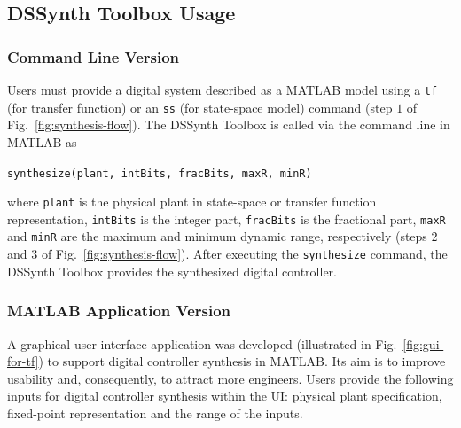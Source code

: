 \documentclass[10pt,conference]{IEEEtran}
\newcommand\tool{{DSSynth Toolbox}\xspace}
\begin{document}
\subsection{\tool Usage}

\subsubsection{Command Line Version}

Users must provide a digital system described as a MATLAB model using a
\texttt{tf} (for transfer function) or an \texttt{ss} (for state-space
model) command (step $1$ of Fig.~\ref{fig:synthesis-flow}).  The \tool is
called via the command line in MATLAB as

\begin{center} 
\texttt{synthesize(plant, intBits, fracBits, maxR, minR)}
\end{center} 

\noindent where \texttt{plant} is the physical plant in state-space or
transfer function representation, \texttt{intBits} is the integer part,
\texttt{fracBits} is the fractional part, \texttt{maxR} and \texttt{minR}
are the maximum and minimum dynamic range, respectively (steps $2$ and
$3$ of Fig.~\ref{fig:synthesis-flow}).
%
After executing the \texttt{synthesize} command, the \tool provides the
synthesized digital controller.

\subsubsection{MATLAB Application Version} 

A graphical user interface application was developed (illustrated in
Fig.~\ref{fig:gui-for-tf}) to support digital controller synthesis in
MATLAB.  Its aim is to improve usability and, consequently, to attract more
engineers.  Users provide the following inputs for digital controller
synthesis within the UI: physical plant specification, fixed-point
representation and the range of the inputs.
\end{document}
